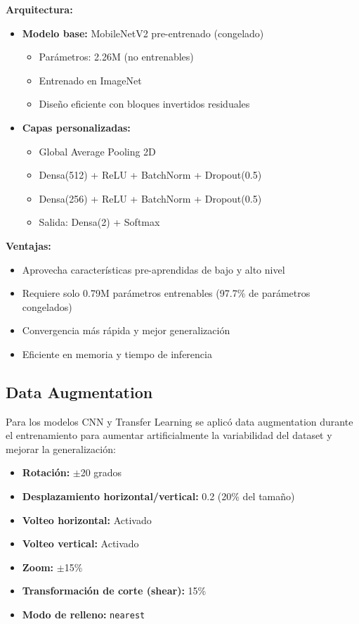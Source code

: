 \documentclass[11pt, a4paper]{article}
\begin{document}
\textbf{Arquitectura:}
\begin{itemize}
    \item \textbf{Modelo base:} MobileNetV2 pre-entrenado (congelado)
    \begin{itemize}
        \item Parámetros: 2.26M (no entrenables)
        \item Entrenado en ImageNet
        \item Diseño eficiente con bloques invertidos residuales
    \end{itemize}
    \item \textbf{Capas personalizadas:}
    \begin{itemize}
        \item Global Average Pooling 2D
        \item Densa(512) + ReLU + BatchNorm + Dropout(0.5)
        \item Densa(256) + ReLU + BatchNorm + Dropout(0.5)
        \item Salida: Densa(2) + Softmax
    \end{itemize}
\end{itemize}

\textbf{Ventajas:}
\begin{itemize}
    \item Aprovecha características pre-aprendidas de bajo y alto nivel
    \item Requiere solo 0.79M parámetros entrenables (97.7\% de parámetros congelados)
    \item Convergencia más rápida y mejor generalización
    \item Eficiente en memoria y tiempo de inferencia
\end{itemize}

\subsection{Data Augmentation}

Para los modelos CNN y Transfer Learning se aplicó data augmentation durante el entrenamiento para aumentar artificialmente la variabilidad del dataset y mejorar la generalización:

\begin{itemize}
    \item \textbf{Rotación:} $\pm$20 grados
    \item \textbf{Desplazamiento horizontal/vertical:} 0.2 (20\% del tamaño)
    \item \textbf{Volteo horizontal:} Activado
    \item \textbf{Volteo vertical:} Activado
    \item \textbf{Zoom:} $\pm$15\%
    \item \textbf{Transformación de corte (shear):} 15\%
    \item \textbf{Modo de relleno:} \texttt{nearest}
\end{itemize}
\end{document}
